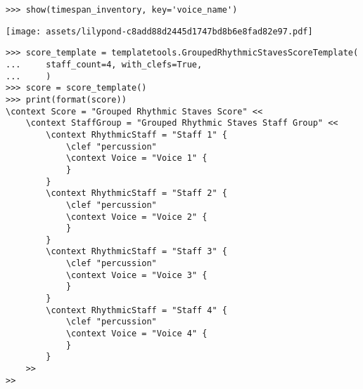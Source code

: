 \begin{comment}
<abjad>
show(timespan_inventory, key='voice_name')
score_template = templatetools.GroupedRhythmicStavesScoreTemplate(
    staff_count=4, with_clefs=True,
    )
score = score_template()
print(format(score))
</abjad>
\end{comment}

\begin{abjadbookoutput}
\begin{singlespacing}
\vspace{-0.5\baselineskip}
\begin{lstlisting}
>>> show(timespan_inventory, key='voice_name')
\end{lstlisting}
\noindent\texttt{[image: assets/lilypond-c8add88d2445d1747bd8b6e8fad82e97.pdf]}
\begin{lstlisting}
>>> score_template = templatetools.GroupedRhythmicStavesScoreTemplate(
...     staff_count=4, with_clefs=True,
...     )
>>> score = score_template()
>>> print(format(score))
\context Score = "Grouped Rhythmic Staves Score" <<
    \context StaffGroup = "Grouped Rhythmic Staves Staff Group" <<
        \context RhythmicStaff = "Staff 1" {
            \clef "percussion"
            \context Voice = "Voice 1" {
            }
        }
        \context RhythmicStaff = "Staff 2" {
            \clef "percussion"
            \context Voice = "Voice 2" {
            }
        }
        \context RhythmicStaff = "Staff 3" {
            \clef "percussion"
            \context Voice = "Voice 3" {
            }
        }
        \context RhythmicStaff = "Staff 4" {
            \clef "percussion"
            \context Voice = "Voice 4" {
            }
        }
    >>
>>
\end{lstlisting}
\end{singlespacing}
\end{abjadbookoutput}


